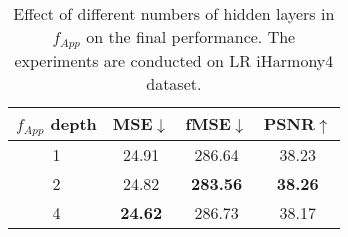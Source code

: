 \documentclass[10pt,journal,twocolumn,twoside]{IEEEtran}
\begin{document}
\begin{table}[t]
\caption{Effect of different numbers of hidden layers in $f_{Cont}$ on the final performance. The experiments are conducted on LR iHarmony4 dataset.}
    \label{tab:Cont MLP depth}
    \renewcommand{\arraystretch}{1.3} 
    \centering
    
\end{table}

\begin{table}[!ht]
\caption{Effect of different numbers of hidden layers in $f_{App}$ on the final performance. The experiments are conducted on LR iHarmony4 dataset.}
    \label{tab:App MLP depth}
\centering
\begin{tabular}{c|ccc}
\hline
$f_{App}$ depth & \multicolumn{1}{c}{MSE$\downarrow$} & \multicolumn{1}{c}{fMSE$\downarrow$} & \multicolumn{1}{c}{PSNR$\uparrow$} \\ \hline
1     & 24.91                   & 286.64                   & 38.23                    \\
2     & 24.82                   & \textbf{283.56}          & \textbf{38.26}           \\
4     & \textbf{24.62}          & 286.73                   & 38.17                    \\ \hline
\end{tabular}
    
\end{table}
\end{document}
